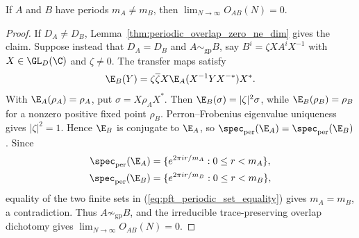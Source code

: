 \begin{lemma}%
    \label{thm:periodic_overlap_zero_ne_period}
    \leanok
    If $A$ and $B$ have periods $m_A\ne m_B$, then
    $\lim_{N\to\infty}O_{AB}(N)=0$.
\end{lemma}
\begin{proof}\leanok
    If $D_A\ne D_B$, Lemma~\ref{thm:periodic_overlap_zero_ne_dim} gives the
    claim. Suppose instead that $D_A=D_B$ and $A\sim_{\mathrm{gp}}B$, say
    $B^i=\zeta XA^iX^{-1}$ with $X\in\GL_D(\C)$ and
    $\zeta\ne0$. The transfer maps satisfy
    \begin{align}
        \E_B(Y)
        =
        \zeta\overline{\zeta}
        X\E_A(X^{-1}YX^{-*})X^*. \notag
    \end{align}
    With $\E_A(\rho_A)=\rho_A$, put $\sigma=X\rho_AX^*$. Then
    $\E_B(\sigma)=|\zeta|^2\sigma$, while $\E_B(\rho_B)=\rho_B$ for a
    nonzero positive fixed point $\rho_B$. Perron--Frobenius eigenvalue
    uniqueness \cite[Theorem~6.3]{Wolf2012Quantum} gives $|\zeta|^2=1$.
    Hence $\E_B$ is conjugate to $\E_A$, so
    $\spec_{\mathrm{per}}(\E_A)=\spec_{\mathrm{per}}(\E_B)$. Since
    \begin{align}
        \spec_{\mathrm{per}}(\E_A)
         & =\{e^{2\pi ir/m_A}:0\le r<m_A\}, \notag \\
        \spec_{\mathrm{per}}(\E_B)
         & =\{e^{2\pi ir/m_B}:0\le r<m_B\},
        \label{eq:pft_periodic_set_equality}
    \end{align}
    equality of the two finite sets in (\ref{eq:pft_periodic_set_equality})
    gives $m_A=m_B$, a contradiction. Thus
    $A\not\sim_{\mathrm{gp}}B$, and the irreducible trace-preserving overlap
    dichotomy gives $\lim_{N\to\infty}O_{AB}(N)=0$.
\end{proof}

